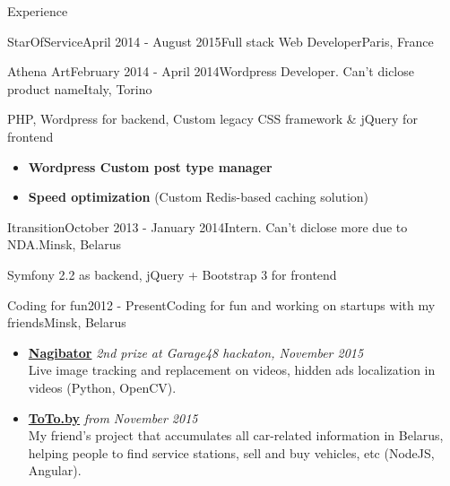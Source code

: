 \documentclass{resume} %
\begin{document}
\begin{rSection}{Experience}
\begin{rSubsection}{StarOfService}{April 2014 - August 2015}{Full stack Web Developer}{Paris, France}
\end{rSubsection}


\begin{rSubsection}{Athena Art}{February 2014 - April 2014}{Wordpress Developer. Can't diclose product name}{Italy, Torino}
\item PHP, Wordpress for backend, Custom legacy CSS framework \& jQuery for frontend


\begin{itemize}[leftmargin=*,label={$+$}]
  \item {\bf Wordpress Custom post type manager}
  \item {\bf Speed optimization} (Custom Redis-based caching solution)
\end{itemize}

\end{rSubsection}
\clearpage


\begin{rSubsection}{Itransition}{October 2013 - January 2014}{Intern. Can't diclose more due to NDA.}{Minsk, Belarus}
\item Symfony 2.2 as backend, jQuery + Bootstrap 3 for frontend
\end{rSubsection}


\begin{rSubsection}{Coding for fun}{2012 - Present}{Coding for fun and working on startups with my friends}{Minsk, Belarus}

\begin{itemize}[leftmargin=*,label={$+$}]
  \item {\bf \href{http://nagibator.xyz}{Nagibator}} \hfill {\em 2nd prize at Garage48 hackaton, November 2015}  \\
	Live image tracking and replacement on videos, hidden ads localization in videos (Python, OpenCV).

  \item {\bf \href{http://toto.by}{ToTo.by}} \hfill {\em from November 2015}  \\
	My friend's project that accumulates all car-related information in Belarus, helping people to find service stations, sell and buy vehicles, etc (NodeJS, Angular).


\end{itemize}
\end{rSubsection}
\end{rSection}
\end{document}
